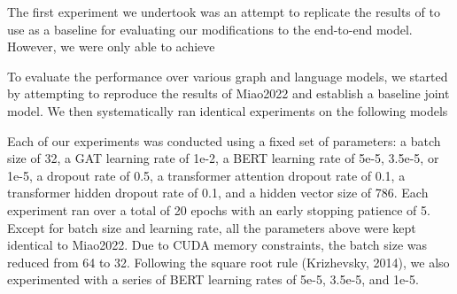 \documentclass[letterpaper]{article} %
\begin{document}
The first experiment we undertook was an attempt to replicate the results of \citet{Miao2022} to use as a baseline for evaluating our modifications to the end-to-end model. However, we were only able to achieve 


To evaluate the performance over various graph and language models, we started by attempting to reproduce the results of Miao2022 and establish a baseline joint model. 
We then systematically ran identical experiments on the following models

Each of our experiments was conducted using a fixed set of parameters: a batch size of 32, a GAT learning rate of 1e-2, a BERT learning rate of 5e-5, 3.5e-5, or 1e-5, a dropout rate of 0.5, a transformer attention dropout rate of 0.1, a transformer hidden dropout rate of 0.1, and a hidden vector size of 786. Each experiment ran over a total of 20 epochs with an early stopping patience of 5. Except for batch size and learning rate, all the parameters above were kept identical to Miao2022. Due to CUDA memory constraints, the batch size was reduced from 64 to 32. Following the square root rule (Krizhevsky, 2014), we also experimented with a series of BERT learning rates of 5e-5, 3.5e-5, and 1e-5.
 
\end{document}
